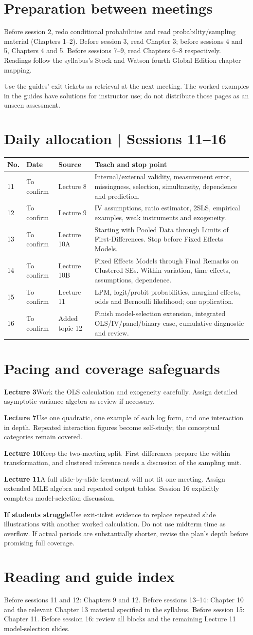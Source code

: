 \documentclass[11pt,a4paper]{article}
\newcommand{\heading}[1]{\section*{\color{accent}#1}}
\newcommand{\cue}[2]{\par\noindent\textbf{#1}\quad #2\par}
\begin{document}
\heading{Preparation between meetings}
Before session 2, redo conditional probabilities and read probability/sampling material (Chapters 1--2). Before session 3, read Chapter 3; before sessions 4 and 5, Chapters 4 and 5. Before sessions 7--9, read Chapters 6--8 respectively. Readings follow the syllabus's Stock and Watson fourth Global Edition chapter mapping.

Use the guides' exit tickets as retrieval at the next meeting. The worked examples in the guides have solutions for instructor use; do not distribute those pages as an unseen assessment.
\newpage
\heading{Daily allocation | Sessions 11--16}
\small
\begin{tabularx}{\textwidth}{@{}p{9mm}p{23mm}p{28mm}X@{}}\toprule
No. & Date & Source & Teach and stop point\\\midrule
11 & To confirm & Lecture 8 & Internal/external validity, measurement error, missingness, selection, simultaneity, dependence and prediction.\\[5pt]
12 & To confirm & Lecture 9 & IV assumptions, ratio estimator, 2SLS, empirical examples, weak instruments and exogeneity.\\[5pt]
13 & To confirm & Lecture 10A & Starting with Pooled Data through Limits of First-Differences. Stop before Fixed Effects Models.\\[5pt]
14 & To confirm & Lecture 10B & Fixed Effects Models through Final Remarks on Clustered SEs. Within variation, time effects, assumptions, dependence.\\[5pt]
15 & To confirm & Lecture 11 & LPM, logit/probit probabilities, marginal effects, odds and Bernoulli likelihood; one application.\\[5pt]
16 & To confirm & Added topic 12 & Finish model-selection extension, integrated OLS/IV/panel/binary case, cumulative diagnostic and review.\\\bottomrule
\end{tabularx}
\normalsize
\heading{Pacing and coverage safeguards}
\cue{Lecture 3}{Work the OLS calculation and exogeneity carefully. Assign detailed asymptotic variance algebra as review if necessary.}
\cue{Lecture 7}{Use one quadratic, one example of each log form, and one interaction in depth. Repeated interaction figures become self-study; the conceptual categories remain covered.}
\cue{Lecture 10}{Keep the two-meeting split. First differences prepare the within transformation, and clustered inference needs a discussion of the sampling unit.}
\cue{Lecture 11}{A full slide-by-slide treatment will not fit one meeting. Assign extended MLE algebra and repeated output tables. Session 16 explicitly completes model-selection discussion.}
\cue{If students struggle}{Use exit-ticket evidence to replace repeated slide illustrations with another worked calculation. Do not use midterm time as overflow. If actual periods are substantially shorter, revise the plan's depth before promising full coverage.}
\heading{Reading and guide index}
Before sessions 11 and 12: Chapters 9 and 12. Before sessions 13--14: Chapter 10 and the relevant Chapter 13 material specified in the syllabus. Before session 15: Chapter 11. Before session 16: review all blocks and the remaining Lecture 11 model-selection slides.
\end{document}
